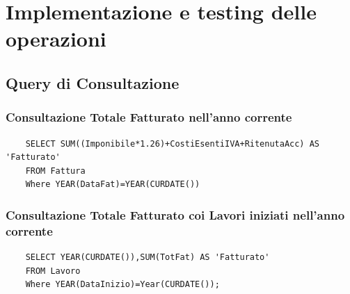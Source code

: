 \documentclass{elegantbook}
\begin{document}
\section{Implementazione e testing delle operazioni}
\subsection{Query di Consultazione}
\subsubsection{Consultazione Totale Fatturato nell'anno corrente}
\begin{verbatim}
	SELECT SUM((Imponibile*1.26)+CostiEsentiIVA+RitenutaAcc) AS 'Fatturato'
	FROM Fattura
	Where YEAR(DataFat)=YEAR(CURDATE())
\end{verbatim}
\begin{figure}[H]
	\centering
\end{figure}
\subsubsection{Consultazione Totale Fatturato coi Lavori iniziati nell'anno corrente}
\begin{verbatim}
	SELECT YEAR(CURDATE()),SUM(TotFat) AS 'Fatturato'
	FROM Lavoro
	Where YEAR(DataInizio)=Year(CURDATE());
\end{verbatim}
	\begin{figure}[H]
	\centering
	\end{figure}
\end{document}
